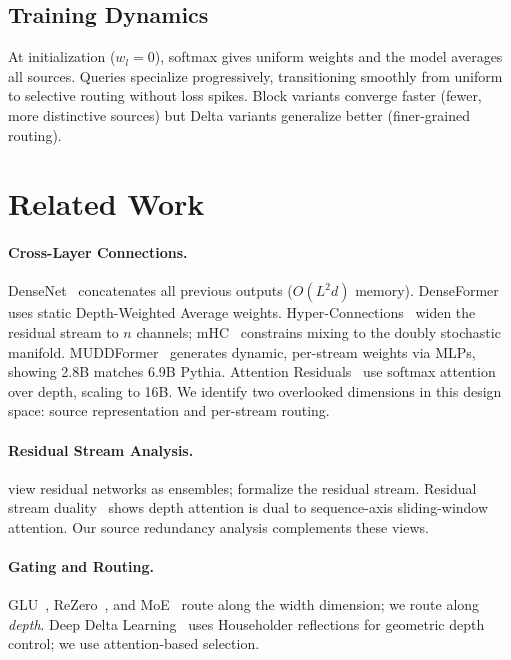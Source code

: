 \documentclass{article}
\begin{document}

\subsection{Training Dynamics}

At initialization ($w_l = 0$), softmax gives uniform weights and the model averages all sources. Queries specialize progressively, transitioning smoothly from uniform to selective routing without loss spikes. Block variants converge faster (fewer, more distinctive sources) but Delta variants generalize better (finer-grained routing).

\section{Related Work}

\paragraph{Cross-Layer Connections.} DenseNet~\citep{huang2017densely} concatenates all previous outputs ($O(L^2 d)$ memory). DenseFormer~\citep{pagliardini2024denseformer} uses static Depth-Weighted Average weights. Hyper-Connections~\citep{zhu2024hyperconnections} widen the residual stream to $n$ channels; mHC~\citep{deepseek2025mhc} constrains mixing to the doubly stochastic manifold. MUDDFormer~\citep{wang2024muddformer} generates dynamic, per-stream weights via MLPs, showing 2.8B matches 6.9B Pythia. Attention Residuals~\citep{kimi2025attention} use softmax attention over depth, scaling to 16B. We identify two overlooked dimensions in this design space: source representation and per-stream routing.

\paragraph{Residual Stream Analysis.} \citet{veit2016residual} view residual networks as ensembles; \citet{elhage2021mathematical} formalize the residual stream. Residual stream duality~\citep{zhang2026duality} shows depth attention is dual to sequence-axis sliding-window attention. Our source redundancy analysis complements these views.

\paragraph{Gating and Routing.} GLU~\citep{shazeer2020glu}, ReZero~\citep{bachlechner2020rezero}, and MoE~\citep{shazeer2017moe,fedus2022switch} route along the width dimension; we route along \emph{depth}. Deep Delta Learning~\citep{zhang2026ddl} uses Householder reflections for geometric depth control; we use attention-based selection.
\end{document}
